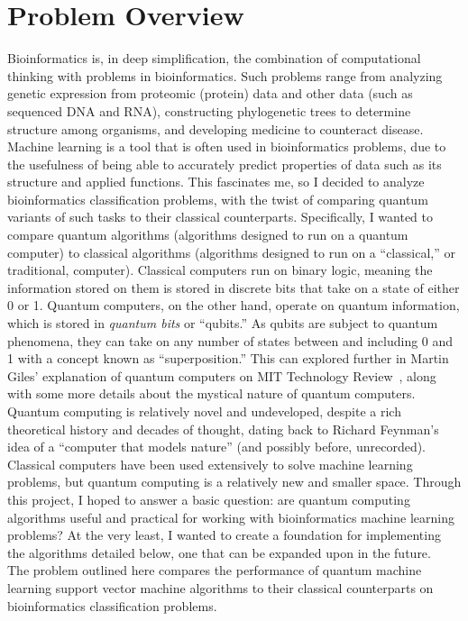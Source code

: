 \documentclass{article}
\begin{document}
\section*{Problem Overview}
  Bioinformatics is, in deep simplification, the combination of computational thinking with problems in bioinformatics. Such problems range from analyzing genetic expression from proteomic (protein) data and other data (such as sequenced DNA and RNA), constructing phylogenetic trees to determine structure among organisms, and developing medicine to counteract disease. Machine learning is a tool that is often used in bioinformatics problems, due to the usefulness of being able to accurately predict properties of data such as its structure and applied functions. This fascinates me, so I decided to analyze bioinformatics classification problems, with the twist of comparing quantum variants of such tasks to their classical counterparts. Specifically, I wanted to compare quantum algorithms (algorithms designed to run on a quantum computer) to classical algorithms (algorithms designed to run on a ``classical,'' or traditional, computer). Classical computers run on binary logic, meaning the information stored on them is stored in discrete bits that take on a state of either 0 or 1. Quantum computers, on the other hand, operate on quantum information, which is stored in \textit{quantum bits} or ``qubits.'' As qubits are subject to quantum phenomena, they can take on any number of states between and including 0 and 1 with a concept known as ``superposition.'' This can explored further in Martin Giles' explanation of quantum computers on MIT Technology Review~\cite{giles}, along with some more details about the mystical nature of quantum computers. Quantum computing is relatively novel and undeveloped, despite a rich theoretical history and decades of thought, dating back to Richard Feynman's idea of a ``computer that models nature'' (and possibly before, unrecorded). Classical computers have been used extensively to solve machine learning problems, but quantum computing is a relatively new and smaller space. Through this project, I hoped to answer a basic question: are quantum computing algorithms useful and practical for working with bioinformatics machine learning problems? At the very least, I wanted to create a foundation for implementing the algorithms detailed below, one that can be expanded upon in the future. \\

  The problem outlined here compares the performance of quantum machine learning support vector machine algorithms to their classical counterparts on bioinformatics classification problems.
\end{document}
